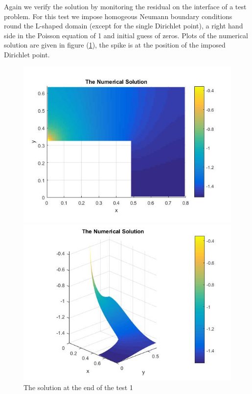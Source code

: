 \documentclass[11pt,a4paper,notitlepage]{article}
\begin{document}
\newpage

Again we verify the solution by monitoring the residual on the interface of a test problem. For this test we impose homogeous Neumann boundary conditions round the L-shaped domain (except for the single Dirichlet point), a right hand side in the Poisson equation of 1 and initial guess of zeros. Plots of the numerical solution are given in figure (\ref{poisson.solplot}), the spike is at the position of the imposed Dirichlet point. 


\begin{figure}[h] 
\begin{minipage}{0.5\textwidth}
\includegraphics[width=1.1\linewidth]{Poisson1.jpg}
\end{minipage}
\begin{minipage}{0.5\textwidth}
\includegraphics[width=1.1\linewidth]{Poisson2.jpg}
\end{minipage}
\caption{The solution at the end of the test 1}
\label{poisson.solplot}
\end{figure}
\end{document}
